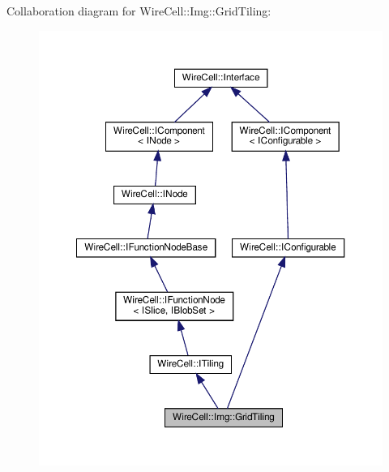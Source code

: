 Collaboration diagram for Wire\+Cell\+:\+:Img\+:\+:Grid\+Tiling\+:
\nopagebreak
\begin{figure}[H]
\begin{center}
\leavevmode
\includegraphics[width=350pt]{class_wire_cell_1_1_img_1_1_grid_tiling__coll__graph}
\end{center}
\end{figure}
